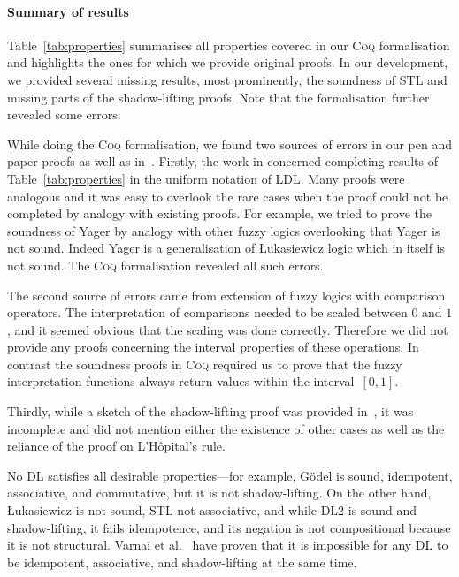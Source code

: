 \documentclass[a4paper,UKenglish,cleveref, autoref, thm-restate]{lipics-v2021}
\def\DLtwo{\textrm{DL2}}
\def\STL{\textrm{STL}}
\def\Yager{\textrm{Yager}}
\def\Luka{\textrm{Łukasiewicz}}
\def\Godel{\textrm{Gödel}}
\def\coq{\textsc{Coq}}
\begin{document}
\paragraph*{Summary of results}
Table~\ref{tab:properties} summarises all properties covered in our \coq{} 
formalisation and highlights the ones for which we provide 
original proofs.
In our development, we provided several missing results, most prominently,
the soundness of \STL{} and missing parts of the shadow-lifting proofs. 
%
Note that the formalisation further revealed some errors:
\begin{example}\label{ex:errors}
While doing the \coq{}  formalisation, we found two sources of errors in our pen and paper proofs \cite{ldl} as well as in~\cite{varnai}.
Firstly, the work in \cite{ldl} concerned completing results of Table~\ref{tab:properties} in the uniform notation of LDL. Many proofs were analogous and it was easy to overlook the rare cases when the proof could not be completed by analogy with existing proofs. For example, we tried to prove the soundness of \Yager{} by analogy with other fuzzy logics overlooking that \Yager{} is not sound. Indeed \Yager{} is a generalisation of \Luka{} logic which in itself is not sound.
The \coq{} formalisation revealed all such errors.

The second source of errors came from extension of fuzzy logics with comparison operators. The interpretation of comparisons needed to be scaled between $0$ and $1$, and it seemed obvious that the scaling was done correctly. Therefore we did not provide any proofs concerning the interval properties of these operations. In contrast the soundness proofs in \coq{} required us to prove that the fuzzy interpretation functions always return values within the interval~$[0,1]$. 

Thirdly, while a sketch of the shadow-lifting proof was provided 
in~\cite{varnai}, it was incomplete and did not mention either the existence of 
other cases as well as the reliance of the proof on L'H\^opital's rule.
\end{example}
No DL satisfies all desirable properties---for example, \Godel{}
is sound, idempotent, associative, and commutative, but it is not
shadow-lifting. On the other hand, \Luka{} is not sound, \STL{} not
associative, and while \DLtwo{} is sound and shadow-lifting, it fails
idempotence, and its negation is not compositional because it is not structural.
Varnai et al.~\cite{varnai} have proven that it is impossible for any DL to be
idempotent, associative, and shadow-lifting at the same time.
\end{document}
